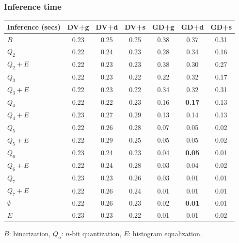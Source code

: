 \documentclass{beamer}
\begin{document}
\begin{frame}
  \frametitle{Inference time}
  \footnotesize
  \begin{table}[h]
    \centering
    \begin{tabular}{l|c|c|c|c|c|c}
      \hline
      \multicolumn{1}{c}{\bfseries Inference (secs)} & \multicolumn{1}{c}{\bfseries DV+g} &
      \multicolumn{1}{c}{\bfseries DV+d} & \multicolumn{1}{c}{\bfseries DV+s} &
      \multicolumn{1}{c}{\bfseries GD+g} & \multicolumn{1}{c}{\bfseries GD+d} &
      \multicolumn{1}{c}{\bfseries GD+s}\\
      \hline
      $B$         & 0.23 & 0.25 & 0.25 & 0.38 & 0.37 & 0.31 \\
      $Q_2$       & 0.22 & 0.24 & 0.23 & 0.28 & 0.34 & 0.16 \\
      $Q_2+E$     & 0.22 & 0.23 & 0.23 & 0.38 & 0.30 & 0.27 \\
      $Q_3$       & 0.22 & 0.23 & 0.22 & 0.22 & 0.32 & 0.17 \\
      $Q_3+E$     & 0.22 & 0.23 & 0.22 & 0.34 & 0.32 & 0.31 \\
      $Q_4$       & 0.22 & 0.22 & 0.23 & 0.16 & \textbf{0.17} & 0.13 \\
      $Q_4+E$     & 0.23 & 0.27 & 0.29 & 0.13 & 0.14 & 0.13 \\
      $Q_5$       & 0.22 & 0.26 & 0.28 & 0.07 & 0.05 & 0.02 \\
      $Q_5+E$     & 0.22 & 0.29 & 0.25 & 0.05 & 0.05 & 0.02 \\
      $Q_6$       & 0.23 & 0.24 & 0.23 & 0.04 & \textbf{0.05} & 0.01 \\
      $Q_6+E$     & 0.22 & 0.24 & 0.28 & 0.03 & 0.04 & 0.02 \\
      $Q_7$       & 0.23 & 0.23 & 0.26 & 0.03 & 0.01 & 0.01 \\
      $Q_7+E$     & 0.22 & 0.26 & 0.24 & 0.01 & 0.01 & 0.01 \\
      $\emptyset$ & 0.22 & 0.26 & 0.23 & 0.02 & \textbf{0.01} & 0.01 \\
      $E$         & 0.23 & 0.23 & 0.22 & 0.01 & 0.01 & 0.02 \\
    \end{tabular}
  \end{table}

  \begin{center}
    $B$: binarization, $Q_n$: $n$-bit quantization, $E$: histogram equalization.
  \end{center}
\end{frame}
\end{document}
